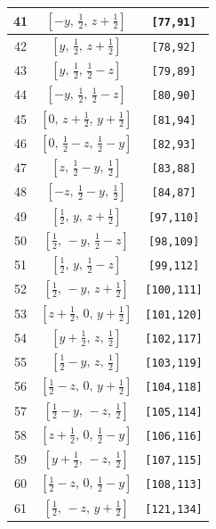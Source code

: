 \documentclass[fleqn,8pt]{jsarticle}
\begin{document}
\begin{longtable}{ccc}
41 & $\left[ - y,\, \frac{1}{2},\, z + \frac{1}{2} \right]$ & {\tt [77,91]} \\ \hline
42 & $\left[ y,\, \frac{1}{2},\, z + \frac{1}{2} \right]$ & {\tt [78,92]} \\ \hline
43 & $\left[ y,\, \frac{1}{2},\, \frac{1}{2} - z \right]$ & {\tt [79,89]} \\ \hline
44 & $\left[ - y,\, \frac{1}{2},\, \frac{1}{2} - z \right]$ & {\tt [80,90]} \\ \hline
45 & $\left[ 0,\, z + \frac{1}{2},\, y + \frac{1}{2} \right]$ & {\tt [81,94]} \\ \hline
46 & $\left[ 0,\, \frac{1}{2} - z,\, \frac{1}{2} - y \right]$ & {\tt [82,93]} \\ \hline
47 & $\left[ z,\, \frac{1}{2} - y,\, \frac{1}{2} \right]$ & {\tt [83,88]} \\ \hline
48 & $\left[ - z,\, \frac{1}{2} - y,\, \frac{1}{2} \right]$ & {\tt [84,87]} \\ \hline
49 & $\left[ \frac{1}{2},\, y,\, z + \frac{1}{2} \right]$ & {\tt [97,110]} \\ \hline
50 & $\left[ \frac{1}{2},\, - y,\, \frac{1}{2} - z \right]$ & {\tt [98,109]} \\ \hline
51 & $\left[ \frac{1}{2},\, y,\, \frac{1}{2} - z \right]$ & {\tt [99,112]} \\ \hline
52 & $\left[ \frac{1}{2},\, - y,\, z + \frac{1}{2} \right]$ & {\tt [100,111]} \\ \hline
53 & $\left[ z + \frac{1}{2},\, 0,\, y + \frac{1}{2} \right]$ & {\tt [101,120]} \\ \hline
54 & $\left[ y + \frac{1}{2},\, z,\, \frac{1}{2} \right]$ & {\tt [102,117]} \\ \hline
55 & $\left[ \frac{1}{2} - y,\, z,\, \frac{1}{2} \right]$ & {\tt [103,119]} \\ \hline
56 & $\left[ \frac{1}{2} - z,\, 0,\, y + \frac{1}{2} \right]$ & {\tt [104,118]} \\ \hline
57 & $\left[ \frac{1}{2} - y,\, - z,\, \frac{1}{2} \right]$ & {\tt [105,114]} \\ \hline
58 & $\left[ z + \frac{1}{2},\, 0,\, \frac{1}{2} - y \right]$ & {\tt [106,116]} \\ \hline
59 & $\left[ y + \frac{1}{2},\, - z,\, \frac{1}{2} \right]$ & {\tt [107,115]} \\ \hline
60 & $\left[ \frac{1}{2} - z,\, 0,\, \frac{1}{2} - y \right]$ & {\tt [108,113]} \\ \hline
61 & $\left[ \frac{1}{2},\, - z,\, y + \frac{1}{2} \right]$ & {\tt [121,134]} \\ \hline

\end{longtable}
\end{document}
